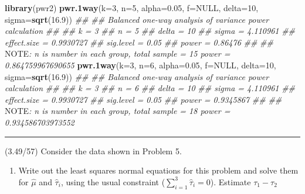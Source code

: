 \documentclass[]{article}
\newenvironment{Shaded}{\begin{snugshade}}{\end{snugshade}}
\newcommand{\AlertTok}[1]{\textcolor[rgb]{0.94,0.16,0.16}{#1}}
\newcommand{\CommentTok}[1]{\textcolor[rgb]{0.56,0.35,0.01}{\textit{#1}}}
\newcommand{\DataTypeTok}[1]{\textcolor[rgb]{0.13,0.29,0.53}{#1}}
\newcommand{\DecValTok}[1]{\textcolor[rgb]{0.00,0.00,0.81}{#1}}
\newcommand{\FloatTok}[1]{\textcolor[rgb]{0.00,0.00,0.81}{#1}}
\newcommand{\KeywordTok}[1]{\textcolor[rgb]{0.13,0.29,0.53}{\textbf{#1}}}
\newcommand{\NormalTok}[1]{#1}
\newcommand{\OtherTok}[1]{\textcolor[rgb]{0.56,0.35,0.01}{#1}}
\providecommand{\tightlist}{%
  \setlength{\itemsep}{0pt}\setlength{\parskip}{0pt}}
\begin{document}
\begin{Shaded}
\begin{Highlighting}[]
\KeywordTok{library}\NormalTok{(pwr2)}
\KeywordTok{pwr.1way}\NormalTok{(}\DataTypeTok{k=}\DecValTok{3}\NormalTok{, }\DataTypeTok{n=}\DecValTok{5}\NormalTok{, }\DataTypeTok{alpha=}\FloatTok{0.05}\NormalTok{, }\DataTypeTok{f=}\OtherTok{NULL}\NormalTok{, }\DataTypeTok{delta=}\DecValTok{10}\NormalTok{, }\DataTypeTok{sigma=}\KeywordTok{sqrt}\NormalTok{(}\FloatTok{16.9}\NormalTok{))}
\CommentTok{## }
\CommentTok{##      Balanced one-way analysis of variance power calculation }
\CommentTok{## }
\CommentTok{##               k = 3}
\CommentTok{##               n = 5}
\CommentTok{##           delta = 10}
\CommentTok{##           sigma = 4.110961}
\CommentTok{##     effect.size = 0.9930727}
\CommentTok{##       sig.level = 0.05}
\CommentTok{##           power = 0.86476}
\CommentTok{## }
\CommentTok{## }\AlertTok{NOTE}\CommentTok{: n is number in each group, total sample = 15 power = 0.864759967690655}
\KeywordTok{pwr.1way}\NormalTok{(}\DataTypeTok{k=}\DecValTok{3}\NormalTok{, }\DataTypeTok{n=}\DecValTok{6}\NormalTok{, }\DataTypeTok{alpha=}\FloatTok{0.05}\NormalTok{, }\DataTypeTok{f=}\OtherTok{NULL}\NormalTok{, }\DataTypeTok{delta=}\DecValTok{10}\NormalTok{, }\DataTypeTok{sigma=}\KeywordTok{sqrt}\NormalTok{(}\FloatTok{16.9}\NormalTok{))}
\CommentTok{## }
\CommentTok{##      Balanced one-way analysis of variance power calculation }
\CommentTok{## }
\CommentTok{##               k = 3}
\CommentTok{##               n = 6}
\CommentTok{##           delta = 10}
\CommentTok{##           sigma = 4.110961}
\CommentTok{##     effect.size = 0.9930727}
\CommentTok{##       sig.level = 0.05}
\CommentTok{##           power = 0.9345867}
\CommentTok{## }
\CommentTok{## }\AlertTok{NOTE}\CommentTok{: n is number in each group, total sample = 18 power = 0.934586703973552}
\end{Highlighting}
\end{Shaded}

\begin{center}\rule{0.5\linewidth}{\linethickness}\end{center}

(3.49/57) Consider the data shown in Problem 5.

\begin{enumerate}
\def\labelenumi{(\alph{enumi})}
\tightlist
\item
  Write out the least squares normal equations for this problem and
  solve them for \(\hat\mu\) and \(\hat\tau_i\), using the usual
  constraint (\(\sum^3_{i=1} \hat\tau_i=0\)). Estimate \(\tau_1-\tau_2\)
\end{enumerate}
\end{document}

